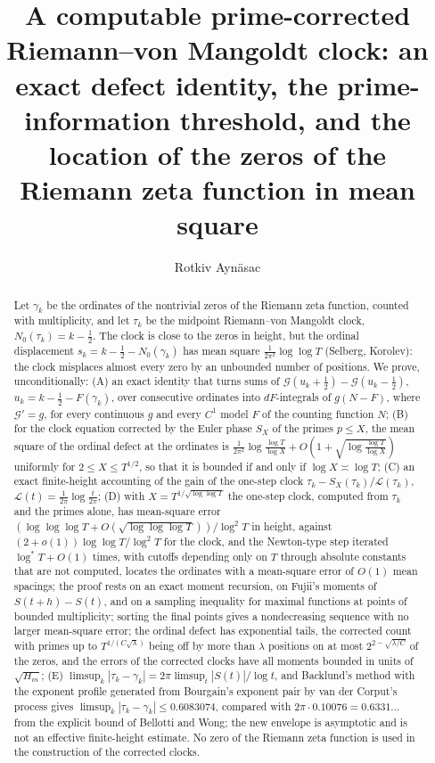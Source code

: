 \documentclass[preprint,12pt]{elsarticle}
\numberwithin{equation}{section}
\theoremstyle{plain}
\theoremstyle{definition}
\theoremstyle{remark}
\newcommand{\NO}{N_0}
\newcommand{\lL}{\mathcal L}
\begin{document}
\begin{frontmatter}
\title{A computable prime-corrected Riemann--von Mangoldt clock: an exact defect identity, the prime-information threshold, and the location of the zeros of the Riemann zeta function in mean square}
\author{Rotkiv Ayn\"asac}

\begin{abstract}
Let $\gamma_k$ be the ordinates of the nontrivial zeros of the Riemann zeta function, counted with multiplicity, and let $\tau_k$ be the midpoint Riemann--von Mangoldt clock, $\NO(\tau_k)=k-\frac12$. The clock is close to the zeros in height, but the ordinal displacement $s_k=k-\frac12-\NO(\gamma_k)$ has mean square $\frac1{2\pi^2}\log\log T$ (Selberg, Korolev): the clock misplaces almost every zero by an unbounded number of positions. We prove, unconditionally: (A) an exact identity that turns sums of $\mathcal G(u_k+\frac12)-\mathcal G(u_k-\frac12)$, $u_k=k-\frac12-F(\gamma_k)$, over consecutive ordinates into $dF$-integrals of $g(N-F)$, where $\mathcal G'=g$, for every continuous $g$ and every $C^1$ model $F$ of the counting function $N$; (B) for the clock equation corrected by the Euler phase $S_X$ of the primes $p\le X$, the mean square of the ordinal defect at the ordinates is $\frac1{2\pi^2}\log\frac{\log T}{\log X}+O(1+\sqrt{\log\frac{\log T}{\log X}})$ uniformly for $2\le X\le T^{1/2}$, so that it is bounded if and only if $\log X\asymp\log T$; (C) an exact finite-height accounting of the gain of the one-step clock $\tau_k-S_X(\tau_k)/\lL(\tau_k)$, $\lL(t)=\frac1{2\pi}\log\frac t{2\pi}$; (D) with $X=T^{1/\sqrt{\log\log T}}$ the one-step clock, computed from $\tau_k$ and the primes alone, has mean-square error $(\log\log\log T+O(\sqrt{\log\log\log T}))/\log^2T$ in height, against $(2+o(1))\log\log T/\log^2T$ for the clock, and the Newton-type step iterated $\log^*T+O(1)$ times, with cutoffs depending only on $T$ through absolute constants that are not computed, locates the ordinates with a mean-square error of $O(1)$ mean spacings; the proof rests on an exact moment recursion, on Fujii's moments of $S(t+h)-S(t)$, and on a sampling inequality for maximal functions at points of bounded multiplicity; sorting the final points gives a nondecreasing sequence with no larger mean-square error; the ordinal defect has exponential tails, the corrected count with primes up to $T^{1/(C\sqrt\lambda)}$ being off by more than $\lambda$ positions on at most $2^{2-\sqrt{\lambda/C}}$ of the zeros, and the errors of the corrected clocks have all moments bounded in units of $\sqrt{H_m}$; (E) $\limsup_k|\tau_k-\gamma_k|=2\pi\limsup_t|S(t)|/\log t$, and Backlund's method with the exponent profile generated from Bourgain's exponent pair by van der Corput's process gives $\limsup_k|\tau_k-\gamma_k|\le0.6083074$, compared with $2\pi\cdot0.10076=0.6331\ldots$ from the explicit bound of Bellotti and Wong; the new envelope is asymptotic and is not an effective finite-height estimate. No zero of the Riemann zeta function is used in the construction of the corrected clocks.
\end{abstract}


\end{frontmatter}
\end{document}
